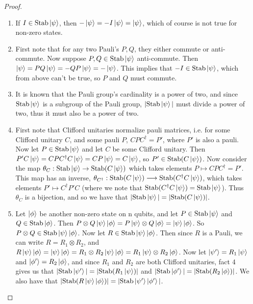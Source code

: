 \documentclass[12pt]{dalthesis}
\begin{document}
\begin{proof}
\hspace{20mm}
\begin{enumerate}
\item If $\-I \in \text{Stab}\ket{\psi}$, then $-\ket{\psi} =-I\ket{\psi} = \ket{\psi}$, which of course is not true for non-zero states.

\item First note that for any two Pauli's $P, Q$, they either commute or anti-commute. Now suppose $P, Q \in \text{Stab}\ket{\psi}$ anti-commute. Then $\ket{\psi} = PQ\ket{\psi} = -QP\ket{\psi} = -\ket{\psi}$. This implies that $-I \in \text{Stab}\ket{\psi}$, which from above can't be true, so $P$ and $Q$ must commute.

\item It is known that the Pauli group's cardinality is a power of two, and since $\text{Stab}\ket{\psi}$ is a subgroup of the Pauli group, $|\text{Stab}\ket{\psi}|$ must divide a power of two, thus it must also be a power of two.

\item First note that Clifford unitaries normalize pauli matrices, i.e. for some Clifford unitary $C$, and some pauli $P$, $CPC^{\dag} = P'$, where $P'$ is also a pauli. Now let $P \in \text{Stab}\ket{\psi}$ and let $C$ be some Clifford unitary. Then $P'C\ket{\psi} = CPC^{\dag}C\ket{\psi} = CP\ket{\psi} = C\ket{\psi}$, so $P' \in \text{Stab}(C\ket{\psi})$. Now consider the map $\theta_C : \text{Stab}\ket{\psi} \rightarrow \text{Stab}(C\ket{\psi})$ which takes elements $P \mapsto CPC^{\dag} = P'$. This map has an inverse, $\theta_{C^\dag}: \text{Stab}(C\ket{\psi}) \longrightarrow \text{Stab}(C^{\dag}C\ket{\psi})$, which takes elements $P' \mapsto C^{\dag}P'C$ (where we note that $\text{Stab}(C^{\dag}C\ket{\psi}) = \text{Stab}\ket{\psi}$). Thus $\theta_C$ is a bijection, and so we have that $|\text{Stab}\ket{\psi}| = |\text{Stab}(C\ket{\psi})|$.

\item Let $\ket{\phi}$ be another non-zero state on n qubits, and let $P \in \text{Stab}\ket{\psi}$ and $Q \in \text{Stab}\ket{\phi}$. Then $P \otimes Q \ket{\psi}\ket{\phi} = P\ket{\psi} \otimes Q\ket{\phi} = \ket{\psi}\ket{\phi}$. So $P \otimes Q \in \text{Stab}\ket{\psi}\ket{\phi}$. Now let $R \in \text{Stab}\ket{\psi}\ket{\phi}$. Then since $R$ is a Pauli, we can write $R = R_1 \otimes R_2$, and $R\ket{\psi}\ket{\phi} = \ket{\psi}\ket{\phi} = R_1 \otimes R_2 \ket{\psi}\ket{\phi} = R_1\ket{\psi} \otimes R_2\ket{\phi}$. Now let $\ket{\psi '} = R_1\ket{\psi}$ and $\ket{\phi '} = R_2\ket{\phi}$, and since $R_1$ and $R_2$ are both Clifford unitaries, fact 4 gives us that $|\text{Stab}\ket{\psi '}| = |\text{Stab}(R_1\ket{\psi})|$ and $|\text{Stab}\ket{\phi '}| = |\text{Stab}(R_2\ket{\phi})|$. We also have that $|\text{Stab}(R\ket{\psi}\ket{\phi})| = |\text{Stab}\ket{\psi '}\ket{\phi '}|$.



\end{enumerate}
\end{proof}
\end{document}

